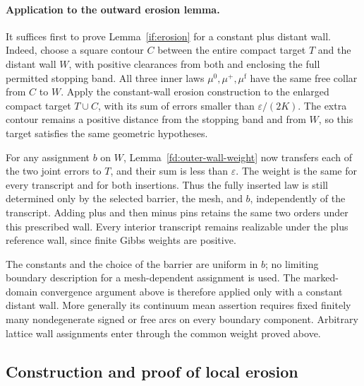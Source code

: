 \documentclass[11pt]{article}
\theoremstyle{definition}
\theoremstyle{remark}
\numberwithin{equation}{section}
\begin{document}
\paragraph{Application to the outward erosion lemma.}
It suffices first to prove Lemma~\ref{if:erosion} for a constant plus
distant wall. Indeed, choose a square contour $C$ between the entire
compact target $T$ and the distant wall $W$, with positive clearances
from both and enclosing the full permitted stopping band. All three
inner laws $\mu^0,\mu^+,\mu^{\mathrm f}$ have the same free collar
from $C$ to $W$. Apply the constant-wall erosion construction to the
enlarged compact target $T\cup C$, with its sum of errors smaller than
$\varepsilon/(2K)$. The extra contour remains a positive distance from
the stopping band and from $W$, so this target satisfies the same
geometric hypotheses.

For any assignment $b$ on $W$, Lemma~\ref{fd:outer-wall-weight} now
transfers each of the two joint errors to $T$, and their sum is less
than $\varepsilon$. The weight is the same for every transcript and
for both insertions. Thus the fully inserted law is still determined
only by the selected barrier, the mesh, and $b$, independently of the
transcript. Adding plus and then minus pins retains the same two
orders under this prescribed wall. Every interior transcript remains
realizable under the plus reference wall, since finite Gibbs weights
are positive.

The constants and the choice of the barrier are uniform in $b$; no
limiting boundary description for a mesh-dependent assignment is used.
The marked-domain convergence argument above is therefore applied only
with a constant distant wall. More generally its continuum mean assertion
requires fixed finitely many nondegenerate signed or free arcs on every
boundary component. Arbitrary lattice wall assignments enter through
the common weight proved above.

\subsection{Construction and proof of local erosion}
\end{document}
